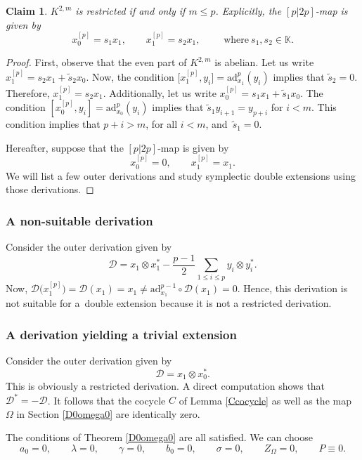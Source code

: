 \documentclass[pdftex]{sigma}
\numberwithin{equation}{section}
\newtheorem{Claim}[Theorem]{Claim}
\begin{document}
\begin{Claim}
 $K^{2,m}$ is restricted if and only if $m\leq p$. Explicitly, the $[p|2p]$-map is given by
\[
x_0^{[p]}=s_1 x_1, \qquad x_1^{[p]}=s_2 x_1, \qquad\text{ where}\ s_1, s_2\in \mathbb K.
\]
\end{Claim}
\begin{proof} First, observe that the even part of $K^{2,m}$ is abelian. Let us write ${x_1^{[p]}=s_2 x_1+ \tilde s_2 x_0}$. Now, the condition $\big[x_1^{[p]},y_i\big]=\mathrm{ad}_{x_1}^p(y_i)$ implies that $\tilde s_2=0$. Therefore, $x_1^{[p]}=s_2 x_1$. Additionally, let us write $x_0^{[p]}=s_1 x_1+ \tilde s_1 x_0$. The condition $[x_0^{[p]},y_i]=\mathrm{ad}_{x_0}^p(y_i)$ implies that $\tilde s_1 y_{i+1}=y_{p+i}$ for $i<m$. This condition implies that $p+i>m$, for all $i<m$, and~$\tilde s_1=0$.

Hereafter, suppose that the $[p|2p]$-map is given by
\[
x_0^{[p]}=0, \qquad x_1^{[p]}= x_1.
\]
We will list a few outer derivations and study symplectic double extensions using those derivations.
\end{proof}
\subsubsection{A non-suitable derivation}
Consider the outer derivation given by
\[
{\mathscr D}= x_1\otimes x_1^*-\frac{p-1}{2} \sum_{1\leq i \leq p} y_i \otimes y_i^*.
\]
Now, ${\mathscr D}\bigl(x_1^{[p]}\bigr)={\mathscr D}( x_1)= x_1\not = \mathrm{ad}_{x_1}^{p-1} \circ {\mathscr D}(x_1)=0.$ Hence, this derivation is not suitable for a~double extension because it is not a restricted derivation.

\subsubsection{A derivation yielding a trivial extension} Consider the outer derivation given by
\[
{\mathscr D}=x_1\otimes x_0^*.
\]
This is obviously a restricted derivation. A direct computation shows that ${\mathscr D}^*=-{\mathscr D}$. It follows that the cocycle $C$ of Lemma \ref{Ccocycle} as well as the map $\Omega$ in Section \ref{D0omega0} are identically zero.

The conditions of Theorem \ref{D0omega0} are all satisfied. We can choose
\[
a_0=0,\qquad \lambda=0,\qquad \gamma=0,\qquad b_0=0,\qquad \sigma=0,\qquad Z_\Omega=0, \qquad P\equiv 0.
\]
\end{document}
